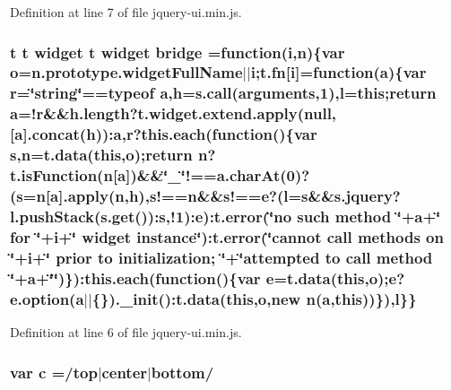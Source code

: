{{Definition at line 7 of file jquery-\/ui.\+min.\+js.

\subsubsection[{\texorpdfstring{bridge}{bridge}}]{ {\bf t} {\bf t} {\bf widget} {\bf t} {\bf widget} bridge =function({\bf i},{\bf n})\{var {\bf o}=n.\+prototype.\+widget\+Full\+Name$\vert$$\vert${\bf i};{\bf t.\+fn}\mbox{[}{\bf i}\mbox{]}=function({\bf a})\{var {\bf r}=\char`\"{}string\char`\"{}==typeof {\bf a},{\bf h}={\bf s.\+call}(arguments,1),{\bf l}={\bf this};return {\bf a}=!{\bf r}\&\&h.\+length?t.\+widget.\+extend.\+apply(null,\mbox{[}{\bf a}\mbox{]}.concat({\bf h}))\+:{\bf a},{\bf r}?{\bf this.\+each}(function()\{var {\bf s},{\bf n}={\bf t.\+data}({\bf this},{\bf o});return {\bf n}?t.\+is\+Function({\bf n}\mbox{[}{\bf a}\mbox{]})\&\&\char`\"{}\+\_\+\char`\"{}!==a.\+char\+At(0)?({\bf s}={\bf n}\mbox{[}{\bf a}\mbox{]}.apply({\bf n},{\bf h}),s!=={\bf n}\&\&s!=={\bf e}?({\bf l}={\bf s}\&\&s.\+jquery?l.\+push\+Stack(s.\+get())\+:{\bf s},!1)\+:{\bf e})\+:t.\+error(\char`\"{}no such method \textquotesingle{}\char`\"{}+a+\char`\"{}\textquotesingle{} for \char`\"{}+i+\char`\"{} widget instance\char`\"{})\+:t.\+error(\char`\"{}cannot {\bf call} methods {\bf on} \char`\"{}+i+\char`\"{} prior to initialization; \char`\"{}+\char`\"{}attempted to {\bf call} method \textquotesingle{}\char`\"{}+a+\char`\"{}\textquotesingle{}\char`\"{})\})\+:{\bf this.\+each}(function()\{var {\bf e}={\bf t.\+data}({\bf this},{\bf o});{\bf e}?e.\+option({\bf a}$\vert$$\vert$\{\}).\+\_\+init()\+:{\bf t.\+data}({\bf this},{\bf o},new {\bf n}({\bf a},{\bf this}))\}),{\bf l}\}\}}\hypertarget{jquery-ui_8min_8js_a937dfd5a26af72e715911d045dbd0f69}{}\label{jquery-ui_8min_8js_a937dfd5a26af72e715911d045dbd0f69}


Definition at line 6 of file jquery-\/ui.\+min.\+js.

\subsubsection[{\texorpdfstring{c}{c}}]{\setlength{\rightskip}{0pt plus 5cm}var c =/top$\vert$center$\vert$bottom/}\hypertarget{jquery-ui_8min_8js_abce695e0af988ece0826d9ad59b8160d}{}\label{jquery-ui_8min_8js_abce695e0af988ece0826d9ad59b8160d}


}}
